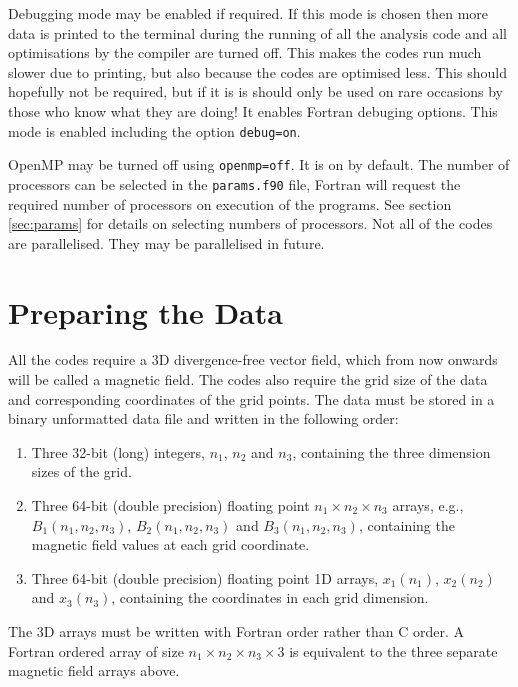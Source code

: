 \documentclass[12pt]{article}
\begin{document}
      Debugging mode may be enabled if required. If this mode is chosen then more data is printed to the terminal during the running of all the analysis code and all optimisations by the compiler are turned off. This makes the codes run much slower due to printing, but also because the codes are optimised less. This should hopefully not be required, but if it is is should only be used on rare occasions by those who know what they are doing! It enables Fortran debuging options. This mode is enabled including the option \texttt{debug=on}.

      OpenMP may be turned off using \texttt{openmp=off}. It is on by default. The number of processors can be selected in the \texttt{params.f90} file, Fortran will request the required number of processors on execution of the programs. See section \ref{sec:params} for details on selecting numbers of processors. Not all of the codes are parallelised. They may be parallelised in future.

  \section{Preparing the Data}
    \label{sec:prep_data}

    All the codes require a 3D divergence-free vector field, which from now onwards will be called a magnetic field. The codes also require the grid size of the data and corresponding coordinates of the grid points. The data must be stored in a binary unformatted data file and written in the following order:
    \begin{enumerate}
      \item Three 32-bit (long) integers, \( n_1 \), \( n_2 \) and \( n_3 \), containing the three dimension sizes of the grid.
      \item Three 64-bit (double precision) floating point \( n_1 \times n_2 \times n_3 \) arrays, e.g., \( B_1(n_1,n_2,n_3) \), \( B_2(n_1,n_2,n_3) \) and \( B_3(n_1,n_2,n_3) \), containing the magnetic field values at each grid coordinate.
      \item Three 64-bit (double precision) floating point 1D arrays, \( x_1(n_1) \), \( x_2(n_2) \) and \( x_3(n_3) \), containing the coordinates in each grid dimension.
    \end{enumerate}
    The 3D arrays must be written with Fortran order rather than C order. A Fortran ordered array of size \( n_1 \times n_2 \times n_3 \times 3 \) is equivalent to the three separate magnetic field arrays above.
\end{document}
